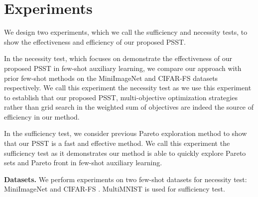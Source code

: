 \documentclass[final]{cvpr}
\begin{document}
\section{Experiments}\label{exper}
 
We design two experiments, which we call the sufficiency and necessity tests, to show the effectiveness and efficiency of our proposed PSST. 

In the necessity test, which focuses on demonstrate the effectiveness of our proposed PSST in few-shot auxiliary learning, we compare our approach with prior few-shot methods on the MiniImageNet and CIFAR-FS datasets respectively.  We call this experiment the necessity test as we use this experiment to establish that our proposed PSST, multi-objective optimization strategies rather than grid search 
in the weighted sum of objectives are indeed the source of efficiency in our method.

In the sufficiency test, we consider previous Pareto exploration method to show that our PSST is a fast and effective method.
We call this experiment the sufficiency test as it demonstrates our method is able to quickly explore Pareto sets and Pareto front in few-shot auxiliary learning.  


\textbf{Datasets.}
We perform experiments on two few-shot datasets for necessity test: MiniImageNet \cite{VinyalsBLKW16} and CIFAR-FS \cite{BertinettoHTV19}. MultiMNIST \cite{sabour2017dynamic} is used for sufficiency test. 
\end{document}

